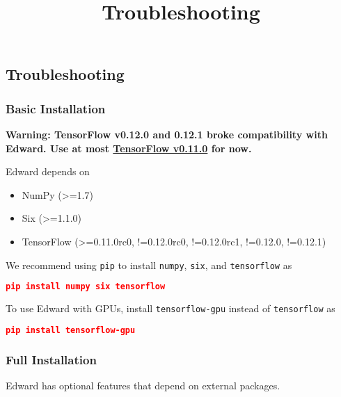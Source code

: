 \title{Troubleshooting}

\subsection{Troubleshooting}

\subsubsection{Basic Installation}

\textbf{Warning: TensorFlow v0.12.0 and 0.12.1 broke
compatibility with Edward. Use at most
\href{https://www.tensorflow.org/versions/r0.11/get_started/os_setup.html#download-and-setup}{TensorFlow v0.11.0} for now.}

Edward depends on

\begin{itemize}
  \item NumPy (>=1.7)
  \item Six (>=1.1.0)
  \item TensorFlow (>=0.11.0rc0, !=0.12.0rc0, !=0.12.0rc1, !=0.12.0, !=0.12.1)
\end{itemize}

We recommend using \texttt{pip} to install \texttt{numpy},
\texttt{six}, and \texttt{tensorflow} as

\begin{lstlisting}[language=JSON]
pip install numpy six tensorflow
\end{lstlisting}

To use Edward with GPUs, install \texttt{tensorflow-gpu} instead of
\texttt{tensorflow} as

\begin{lstlisting}[language=JSON]
pip install tensorflow-gpu
\end{lstlisting}

\subsubsection{Full Installation}

Edward has optional features that depend on external packages.

